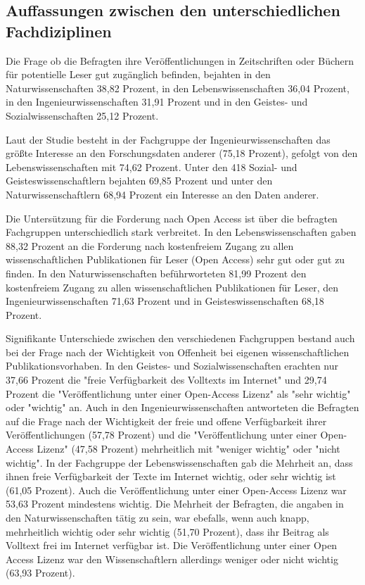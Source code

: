 \subsection{Auffassungen zwischen den unterschiedlichen Fachdiziplinen}

Die Frage ob die Befragten ihre Veröffentlichungen in Zeitschriften oder Büchern für potentielle Leser gut zugänglich befinden, bejahten in den Naturwissenschaften 38,82 Prozent, in den Lebenswissenschaften 36,04 Prozent, in den Ingenieurwissenschaften 31,91 Prozent und in den Geistes- und Sozialwissenschaften 25,12 Prozent.

Laut der Studie besteht in der Fachgruppe der Ingenieurwissenschaften das größte Interesse an den Forschungsdaten anderer (75,18 Prozent), gefolgt von den Lebenswissenschaften mit 74,62 Prozent. Unter den 418 Sozial- und Geisteswissenschaftlern bejahten 69,85 Prozent und unter den Naturwissenschaftlern 68,94 Prozent ein Interesse an den Daten anderer.

Die Untersützung für die Forderung nach Open Access ist über die befragten Fachgruppen unterschiedlich stark verbreitet. In den Lebenswissenschaften gaben 88,32 Prozent an die Forderung nach kostenfreiem Zugang zu allen wissenschaftlichen Publikationen für Leser (Open Access) sehr gut oder gut zu finden. In den Naturwissenschaften beführworteten 81,99 Prozent den kostenfreiem Zugang zu allen wissenschaftlichen Publikationen für Leser, den Ingenieurwissenschaften 71,63 Prozent und in Geisteswissenschaften 68,18 Prozent.

Signifikante Unterschiede zwischen den verschiedenen Fachgruppen bestand auch bei der Frage nach der Wichtigkeit von Offenheit bei eigenen wissenschaftlichen Publikationsvorhaben. In den Geistes- und Sozialwissenschaften erachten nur 37,66 Prozent die "freie Verfügbarkeit des Volltexts im Internet" und 29,74 Prozent die "Veröffentlichung unter einer Open-Access Lizenz" als "sehr wichtig" oder "wichtig" an. Auch in den Ingenieurwissenschaften antworteten die Befragten auf die Frage nach der Wichtigkeit der freie und offene Verfügbarkeit ihrer Veröffentlichungen (57,78 Prozent) und die "Veröffentlichung unter einer Open-Access Lizenz" (47,58 Prozent) mehrheitlich mit "weniger wichtig" oder "nicht wichtig". In der Fachgruppe der Lebenswissenschaften gab die Mehrheit an, dass ihnen freie Verfügbarkeit der Texte im Internet wichtig, oder sehr wichtig ist (61,05 Prozent). Auch die Veröffentlichung unter einer Open-Access Lizenz war 53,63 Prozent mindestens wichtig. Die Mehrheit der Befragten, die angaben in den Naturwissenschaften tätig zu sein, war ebefalls, wenn auch knapp, mehrheitlich wichtig oder sehr wichtig (51,70 Prozent), dass ihr Beitrag als Volltext frei im Internet verfügbar ist. Die Veröffentlichung unter einer Open Access Lizenz war den Wissenschaftlern allerdings weniger oder nicht wichtig (63,93 Prozent).

